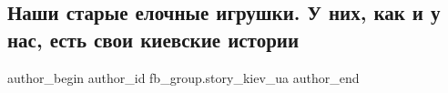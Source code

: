  
 
 
 
 
 
\subsection{Наши старые елочные игрушки. У них, как и у нас, есть свои киевские истории}
\label{sec:26_12_2021.fb.fb_group.story_kiev_ua.1.jelochnye_igruski}
 
\ifcmt
 author_begin
   author_id fb_group.story_kiev_ua
 author_end
\fi
